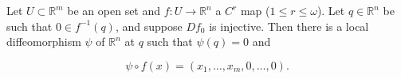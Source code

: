 Let $U \subset \mathbb{R}^m$ be an open set and $f: U \to \mathbb{R}^n$ a $C^r$ map ($1 \leqslant r \leqslant \omega$). Let $q \in \mathbb{R}^n$ be such that $0 \in f^{-1}(q)$, and suppose $Df_0$ is injective. Then there is a local diffeomorphism $\psi$ of $\mathbb{R}^n$ at $q$ such that $\psi(q) = 0$ and

$$\psi \circ f(x) = (x_1, \ldots, x_m, 0, \ldots, 0).$$
